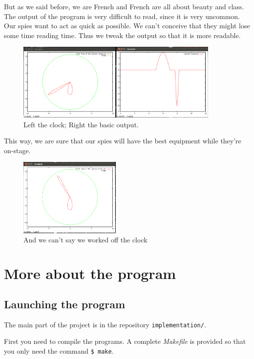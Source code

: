 \documentclass[11pt,a4paper]{article}
\begin{document}
But as we said before, we are French and French are all about beauty and class. The output of the program is very difficult to read, since it is very uncommon. Our spies want to act as quick as possible. We can't conceive that they might lose some time reading time. Thus we tweak the output so that it is more readable.

\begin{figure}[!h]
\centering
\includegraphics[width=10cm]{clock2.png}
\caption{Left the clock; Right the basic output.}
\label{clock2}
\end{figure}

This way, we are sure that our spies will have the best equipment while they're on-stage.

\begin{figure}[!h]
\centering
\includegraphics[width=5cm]{clock3.png}
\caption{And we can't say we worked off the clock}
\label{clock3}
\end{figure}

\newpage

\appendix

\section{More about the program}

\subsection{Launching the program}

The main part of the project is in the repository \verb_implementation/_.

First you need to compile the programs. A complete \textit{Makefile} is provided so that you only need the command \verb_$ make_.\\
\end{document}
